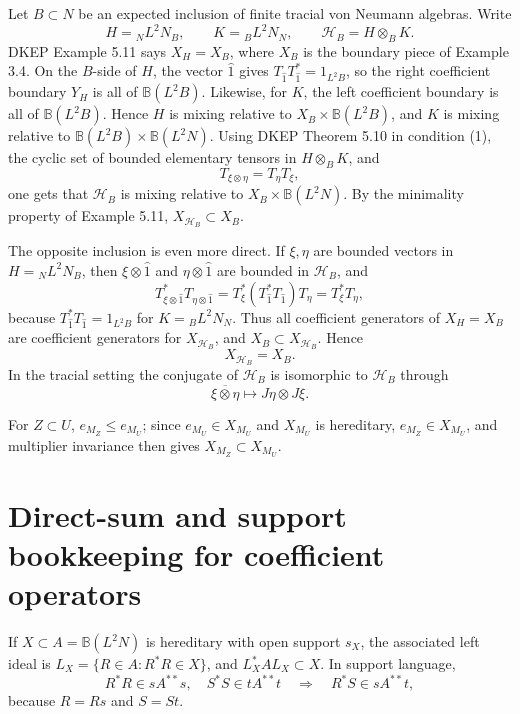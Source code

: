 \documentclass{article}
\begin{document}
Let \(B\subset N\) be an expected inclusion of finite tracial von Neumann
algebras.  Write
\[
H={}_N L^2N_B,\qquad K={}_B L^2N_N,\qquad
\mathcal H_B=H\otimes_B K.
\]
DKEP Example 5.11 says \(X_H=X_B\), where \(X_B\) is the boundary piece of
Example 3.4.  On the \(B\)-side of \(H\), the vector \(\widehat 1\) gives
\(T_{\widehat 1}T_{\widehat 1}^{*}=1_{L^2B}\), so the right coefficient
boundary \(Y_H\) is all of \(\mathbb B(L^2B)\).  Likewise, for \(K\), the left
coefficient boundary is all of \(\mathbb B(L^2B)\).  Hence \(H\) is mixing
relative to \(X_B\times\mathbb B(L^2B)\), and \(K\) is mixing relative to
\(\mathbb B(L^2B)\times\mathbb B(L^2N)\).  Using DKEP Theorem 5.10 in condition
(1), the cyclic set of bounded elementary tensors in \(H\otimes_BK\), and
\[
        T_{\xi\otimes\eta}=T_\eta T_\xi,
\]
one gets that \(\mathcal H_B\) is mixing relative to
\(X_B\times\mathbb B(L^2N)\).  By the minimality property of Example 5.11,
\(X_{\mathcal H_B}\subset X_B\).

The opposite inclusion is even more direct.  If \(\xi,\eta\) are bounded
vectors in \(H={}_NL^2N_B\), then \(\xi\otimes\widehat1\) and
\(\eta\otimes\widehat1\) are bounded in \(\mathcal H_B\), and
\[
        T_{\xi\otimes\widehat1}^*T_{\eta\otimes\widehat1}
        =T_\xi^*(T_{\widehat1}^*T_{\widehat1})T_\eta=T_\xi^*T_\eta,
\]
because \(T_{\widehat1}^*T_{\widehat1}=1_{L^2B}\) for
\(K={}_BL^2N_N\).  Thus all coefficient generators of \(X_H=X_B\) are
coefficient generators for \(X_{\mathcal H_B}\), and
\(X_B\subset X_{\mathcal H_B}\).  Hence
\[
        X_{\mathcal H_B}=X_B.
\]
In the tracial setting the conjugate of \(\mathcal H_B\) is isomorphic to
\(\mathcal H_B\) through
\[
        \overline{\xi\otimes\eta}\mapsto J\eta\otimes J\xi .
\]

For \(Z\subset U\), \(e_{M_Z}\leq e_{M_U}\); since \(e_{M_U}\in X_{M_U}\) and
\(X_{M_U}\) is hereditary, \(e_{M_Z}\in X_{M_U}\), and multiplier invariance then
gives \(X_{M_Z}\subset X_{M_U}\).

\section*{Direct-sum and support bookkeeping for coefficient operators}

If \(X\subset A=\mathbb B(L^2N)\) is hereditary with open support \(s_X\), the
associated left ideal is \(L_X=\{R\in A:R^*R\in X\}\), and
\(L_X^* A L_X\subset X\).  In support language,
\[
        R^*R\in sA^{**}s,\quad S^*S\in tA^{**}t
        \quad\Rightarrow\quad R^*S\in sA^{**}t,
\]
because \(R=Rs\) and \(S=St\).
\end{document}

